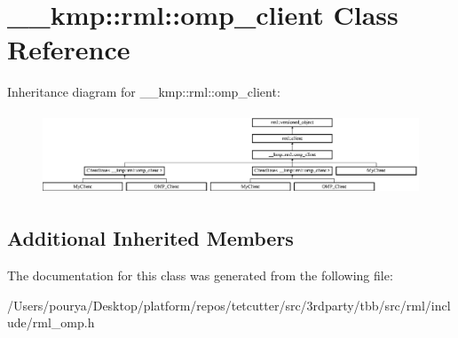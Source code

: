 \hypertarget{class____kmp_1_1rml_1_1omp__client}{}\section{\+\_\+\+\_\+kmp\+:\+:rml\+:\+:omp\+\_\+client Class Reference}
\label{class____kmp_1_1rml_1_1omp__client}
Inheritance diagram for \+\_\+\+\_\+kmp\+:\+:rml\+:\+:omp\+\_\+client\+:\begin{figure}[H]
\begin{center}
\leavevmode
\includegraphics[height=2.445415cm]{class____kmp_1_1rml_1_1omp__client}
\end{center}
\end{figure}
\subsection*{Additional Inherited Members}


The documentation for this class was generated from the following file\+:\begin{DoxyCompactItemize}
\item 
/\+Users/pourya/\+Desktop/platform/repos/tetcutter/src/3rdparty/tbb/src/rml/include/rml\+\_\+omp.\+h\end{DoxyCompactItemize}
